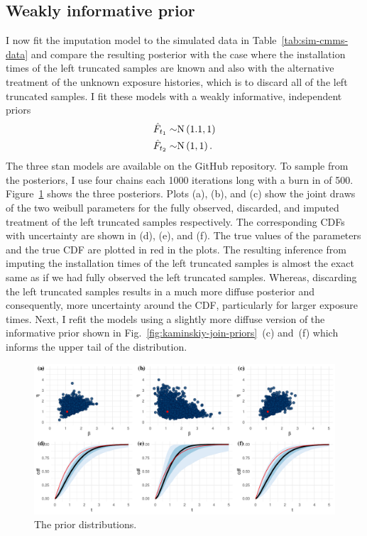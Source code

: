 

\subsection{Weakly informative prior} \label{subsec:weibull-model-fits}

I now fit the imputation model to the simulated data in Table~\ref{tab:sim-cmms-data} and compare the resulting posterior with the case where the installation times of the left truncated samples are known and also with the alternative treatment of the unknown exposure histories, which is to discard all of the left truncated samples. I fit these models with a weakly informative, independent priors
\begin{align*}
    \hat{F}_{t_1} \sim & \hbox{N}\left(1.1, 1\right)  \\
    \hat{F}_{t_2} \sim & \hbox{N}\left(1, 1\right).
\end{align*}
The three stan models are available on the GitHub repository. To sample from the posteriors, I use four chains each 1000 iterations long with a burn in of 500. Figure~\ref{fig:joint-post-weibull} shows the three posteriors. Plots (a), (b), and (c) show the joint draws of the two weibull parameters for the fully observed, discarded, and imputed treatment of the left truncated samples respectively. The corresponding CDFs with uncertainty are shown in (d), (e), and (f). The true values of the parameters and the true CDF are plotted in red in the plots. The resulting inference from imputing the installation times of the left truncated samples is almost the exact same as if we had fully observed the left truncated samples. Whereas, discarding the left truncated samples results in a much more diffuse posterior and consequently, more uncertainty around the CDF, particularly for larger exposure times. Next, I refit the models using a slightly more diffuse version of the informative prior shown in Fig.~\ref{fig:kaminskiy-join-priors}~(c) and~(f) which informs the upper tail of the distribution.

\begin{figure}
    \centering
    \includegraphics[width=1\textwidth]{./figures/ch-2/joint-posts.pdf}
    \caption{The prior distributions.}
    \label{fig:joint-post-weibull}
\end{figure}

